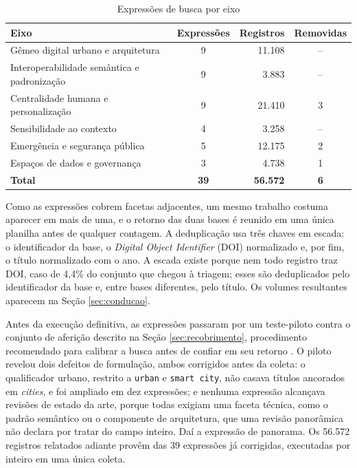 \begin{table}[htb]
\centering
\caption{Expressões de busca por eixo}
\label{tab:expressoes}
\scriptsize
\begin{tabularx}{\textwidth}{@{}X c r c@{}}
\toprule
\textbf{Eixo} & \textbf{Expressões} & \textbf{Registros} & \textbf{Removidas} \\
\midrule
Gêmeo digital urbano e arquitetura & 9 & 11.108 & -- \\
Interoperabilidade semântica e padronização & 9 & 3.883 & -- \\
Centralidade humana e personalização & 9 & 21.410 & 3 \\
Sensibilidade ao contexto & 4 & 3.258 & -- \\
Emergência e segurança pública & 5 & 12.175 & 2 \\
Espaços de dados e governança & 3 & 4.738 & 1 \\
\midrule
\textbf{Total} & \textbf{39} & \textbf{56.572} & \textbf{6} \\
\bottomrule
\end{tabularx}
\end{table}

Como as expressões cobrem facetas adjacentes, um mesmo trabalho costuma aparecer em mais de uma, e o retorno das duas bases é reunido em uma única planilha antes de qualquer contagem. A deduplicação usa três chaves em escada: o identificador da base, o \textit{Digital Object Identifier} (DOI) normalizado e, por fim, o título normalizado com o ano. A escada existe porque nem todo registro traz DOI, caso de 4,4\% do conjunto que chegou à triagem; esses são deduplicados pelo identificador da base e, entre bases diferentes, pelo título. Os volumes resultantes aparecem na Seção \ref{sec:conducao}.

Antes da execução definitiva, as expressões passaram por um teste-piloto contra o conjunto de aferição descrito na Seção \ref{sec:recobrimento}, procedimento recomendado para calibrar a busca antes de confiar em seu retorno \cite{zhang2011identifying}. O piloto revelou dois defeitos de formulação, ambos corrigidos antes da coleta: o qualificador urbano, restrito a \texttt{urban} e \texttt{smart city}, não casava títulos ancorados em \textit{cities}, e foi ampliado em dez expressões; e nenhuma expressão alcançava revisões de estado da arte, porque todas exigiam uma faceta técnica, como o padrão semântico ou o componente de arquitetura, que uma revisão panorâmica não declara por tratar do campo inteiro. Daí a expressão de panorama. Os 56.572 registros relatados adiante provêm das 39 expressões já corrigidas, executadas por inteiro em uma única coleta.

